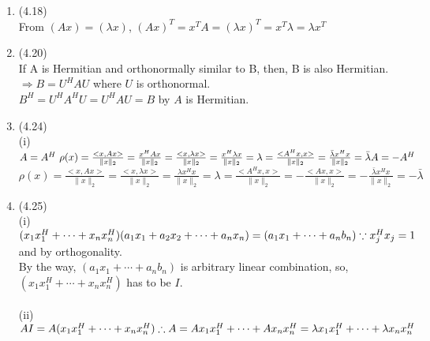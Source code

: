 \documentclass[letterpaper,12pt]{article}
\theoremstyle{definition}
\begin{document}
\begin{enumerate}
(ii) In any form of norms, it has to be same in a reason that we calculate before taking norm.\\ \\
(iii) $f(x) = 3+5x+x^3 \\ \therefore f(\lambda_1)=9$ and $f(\lambda_2)=5.064$




	\item (4.18) \\
From $(Ax)=(\lambda x)$, $(Ax)^T=x^TA=(\lambda x)^T = x^T\lambda = \lambda x^T$




	\item (4.20) \\
If A is Hermitian and orthonormally similar to B, then, B is also Hermitian.\\
$\Rightarrow B=U^HAU$ where $U$ is orthonormal. \\$ B^H =U^HA^HU=U^HAU=B$ by $A$ is Hermitian.





	\item (4.24) \\
(i) $A=A^H \
\rho(x) = \frac{<x,Ax>}{\|x\|_2}=\frac{x^HAx}{\|x\|_2} = \frac{<x,\lambda x>}{\|x\|_2}=\frac{x^H\lambda x}{\|x\|_2} =\lambda = \frac{<A^Hx,x>}{\|x\|_2}=\frac{\bar{\lambda}x^Hx}{\|x\|_2} = \bar{\lambda}\\
A=-A^H \\$
$\rho(x) = \frac{<x,Ax>}{\|x\|_2}=\frac{<x,\lambda x>}{\| x\|_2}=\frac{\lambda x^Hx}{\| x\|_2} = \lambda = \frac{<A^Hx, x>}{\| x\|_2}=-\frac{<Ax, x>}{\|x\|_2}=-\frac{\bar{\lambda}x^Hx}{\|x\|_2}=-\bar{\lambda}
$



	\item (4.25) \\
(i) $(x_1x_1^H + \cdots +x_nx_n^H)(a_1x_1 + a_2x_2 + \cdots + a_nx_n) = (a_1x_1 + \cdots + a_nb_n)\\
\because x_j^Hx_j = 1 $  and by orthogonality.\\
By the way, $ (a_1x_1 + \cdots + a_nb_n)$ is arbitrary linear combination, so, \\$(x_1x_1^H + \cdots +x_nx_n^H)$ has to be $I$.
\\
\\
(ii) $AI = A(x_1x_1^H + \cdots +x_nx_n^H)\\
\therefore A = Ax_1x_1^H + \cdots +Ax_nx_n^H = \lambda x_1x_1^H + \cdots + \lambda x_nx_n^H
$


\end{enumerate}
\end{document}

